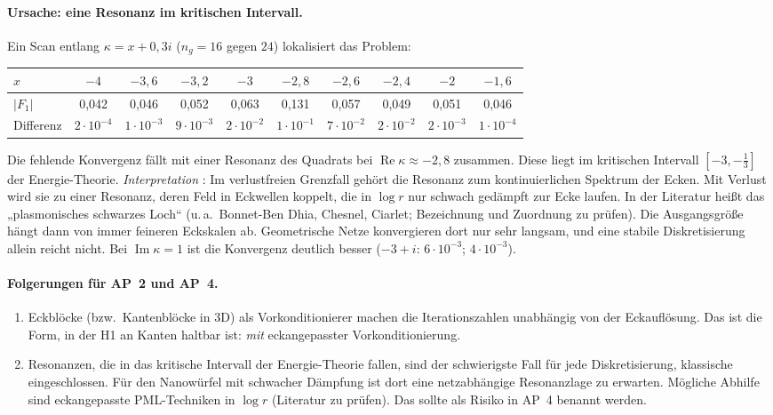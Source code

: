\documentclass[11pt, a4paper]{article}
\theoremstyle{plain}
\theoremstyle{definition}
\newcommand{\status}[1]{\hfill{\small\sffamily[#1]}}
\begin{document}
\paragraph{Ursache: eine Resonanz im kritischen Intervall.} Ein Scan entlang
$\kappa = x+0{,}3i$ ($n_g=16$ gegen $24$) lokalisiert das Problem:
\begin{center}\small
\begin{tabular}{lccccccccc}
\toprule
$x$ & $-4$ & $-3{,}6$ & $-3{,}2$ & $-3$ & $-2{,}8$ & $-2{,}6$ & $-2{,}4$ & $-2$ & $-1{,}6$\\
\midrule
$|F_1|$ & 0,042 & 0,046 & 0,052 & 0,063 & 0,131 & 0,057 & 0,049 & 0,051 & 0,046\\
Differenz & $2\cdot10^{-4}$ & $1\cdot10^{-3}$ & $9\cdot10^{-3}$ & $2\cdot10^{-2}$ & $1\cdot10^{-1}$ & $7\cdot10^{-2}$ & $2\cdot10^{-2}$ & $2\cdot10^{-3}$ & $1\cdot10^{-4}$\\
\bottomrule
\end{tabular}
\end{center}
Die fehlende Konvergenz fällt mit einer Resonanz des Quadrats bei
$\operatorname{Re}\kappa\approx-2{,}8$ zusammen. Diese liegt im kritischen Intervall
$[-3,-\tfrac13]$ der Energie-Theorie.
\emph{Interpretation} \status{Vermutung}: Im verlustfreien Grenzfall gehört die
Resonanz zum kontinuierlichen Spektrum der Ecken. Mit Verlust wird sie zu einer
Resonanz, deren Feld in Eckwellen koppelt, die in $\log r$ nur schwach gedämpft zur
Ecke laufen. In der Literatur heißt das „plasmonisches schwarzes Loch“ (u.\,a.\
Bonnet-Ben Dhia, Chesnel, Ciarlet; Bezeichnung und Zuordnung zu prüfen). Die
Ausgangsgröße hängt dann von immer feineren Eckskalen ab. Geometrische Netze
konvergieren dort nur sehr langsam, und eine stabile Diskretisierung allein
reicht nicht. Bei $\operatorname{Im}\kappa=1$ ist die Konvergenz deutlich besser
($-3+i$: $6\cdot10^{-3}$; $4\cdot10^{-3}$).

\paragraph{Folgerungen für AP~2 und AP~4.}
\begin{enumerate}[leftmargin=*]
  \item Eckblöcke (bzw.\ Kantenblöcke in 3D) als Vorkonditionierer machen die
    Iterationszahlen unabhängig von der Eckauflösung. Das ist die Form, in der H1 an
    Kanten haltbar ist: \emph{mit} eckangepasster Vorkonditionierung.
  \item Resonanzen, die in das kritische Intervall der Energie-Theorie fallen, sind
    der schwierigste Fall für jede Diskretisierung, klassische eingeschlossen. Für
    den Nanowürfel mit schwacher Dämpfung ist dort eine netzabhängige
    Resonanzlage zu erwarten. Mögliche Abhilfe sind eckangepasste PML-Techniken in
    $\log r$ (Literatur zu prüfen). Das sollte als Risiko in AP~4 benannt werden.
\end{enumerate}
\end{document}
